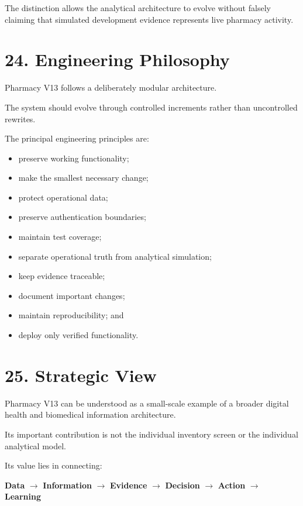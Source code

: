 \documentclass[12pt,a4paper]{article}
\begin{document}
The distinction allows the analytical architecture to evolve without falsely claiming that simulated development evidence represents live pharmacy activity.

\section*{24. Engineering Philosophy}

Pharmacy V13 follows a deliberately modular architecture.

The system should evolve through controlled increments rather than uncontrolled rewrites.

The principal engineering principles are:

\begin{itemize}[leftmargin=1cm]
\item preserve working functionality;
\item make the smallest necessary change;
\item protect operational data;
\item preserve authentication boundaries;
\item maintain test coverage;
\item separate operational truth from analytical simulation;
\item keep evidence traceable;
\item document important changes;
\item maintain reproducibility; and
\item deploy only verified functionality.
\end{itemize}

\section*{25. Strategic View}

Pharmacy V13 can be understood as a small-scale example of a broader digital health and biomedical information architecture.

Its important contribution is not the individual inventory screen or the individual analytical model.

Its value lies in connecting:

\begin{center}
\textbf{Data}
$\rightarrow$
\textbf{Information}
$\rightarrow$
\textbf{Evidence}
$\rightarrow$
\textbf{Decision}
$\rightarrow$
\textbf{Action}
$\rightarrow$
\textbf{Learning}
\end{center}
\end{document}

